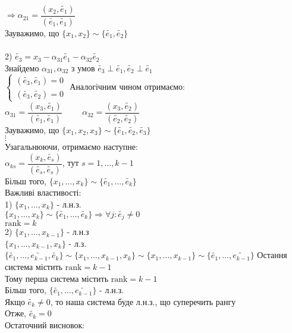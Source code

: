 \documentclass[a4paper, 14pt]{extarticle}
\def\bigline{\vspace{5mm}\\}
\begin{document}
$\Rightarrow \alpha_{21} = \dfrac{(x_2,\tilde{e_1})}{(\tilde{e_1},\tilde{e_1})}$\\
Зауважимо, що $\{x_1,x_2\} \sim \{\tilde{e_1},\tilde{e_2}\}$\\
\\
2) $\tilde{e_3} = x_3 - \alpha_{31} \tilde{e_1} - \alpha_{32} \tilde{e_2}$\\
Знайдемо $\alpha_{31}, \alpha_{32}$ з умов $\tilde{e_3} \perp \tilde{e_1}, \tilde{e_2} \perp \tilde{e_1}$\\
$\begin{cases}
(\tilde{e_3}, \tilde{e_1}) = 0 \\
(\tilde{e_3}, \tilde{e_2}) = 0
\end{cases}
$
Аналогічним чином отримаємо:\\
$\alpha_{31} = \dfrac{(x_3, \tilde{e_1})}{(\tilde{e_1},\tilde{e_1})} \hspace{1cm} \alpha_{32} = \dfrac{(x_3, \tilde{e_2})}{(\tilde{e_2},\tilde{e_2})}$\\
Зауважимо, що $\{x_1,x_2,x_3\} \sim \{\tilde{e_1},\tilde{e_2},\tilde{e_3}\}$\\
$\vdots$\\
Узагальнюючи, отримаємо наступне:\\
$\alpha_{ks} = \dfrac{(x_k, \tilde{e_s})}{(\tilde{e_s},\tilde{e_s})}$, тут $s = {1,\dots,k-1}$\\
Більш того, $\{x_1,\dots,x_k\} \sim \{\tilde{e_1},\dots, \tilde{e_k}\}$
\bigline
Важливі властивості:\\
1) $\{x_1,\dots,x_k\}$ - л.н.з.\\
$\{x_1,\dots,x_k\} \sim \{\tilde{e_1},\dots, \tilde{e_k}\} \Rightarrow \forall j: \tilde{e_j} \neq 0$\\
$\textrm{rank} = k$
\bigline
2) $\{x_1,\dots,x_{k-1}\}$ - л.н.з\\
$\{x_1,\dots,x_{k-1},x_k \}$ - л.з.\\
$\{\tilde{e_1}, \dots, \tilde{e_{k-1}}, \tilde{e_k}\} \sim \{x_1,\dots,x_{k-1},x_k\} \sim \{x_1,\dots,x_{k-1}\} \sim \{\tilde{e_1},\dots, \tilde{e_{k-1}}\}$
Остання система містить $\textrm{rank} = k-1$\\
Тому перша система містить $\textrm{rank} = k-1$\\
Більш того, $\{\tilde{e_1},\dots, \tilde{e_{k-1}}\}$ - л.н.з.\\
Якщо $\tilde{e_k} \neq 0$, то наша система буде л.н.з., що суперечить рангу\\
Отже, $\tilde{e_k} = 0$
\bigline
Остаточний висновок:\\
\end{document}
